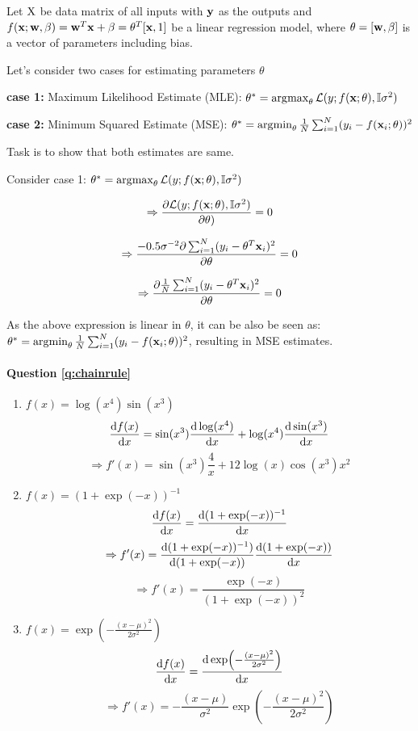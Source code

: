 Let ${\mathrm{{X}}}$ be data matrix of all inputs with $\mathbf{y}$ as the outputs and $f(\mathbf{x}; \mathbf{w}, \beta) = \mathbf{w}^T\mathbf{x} + \beta = \theta^T[\mathbf{x}, 1]$ be a linear regression model, where $\theta=[\mathbf{w}, \beta]$ is a vector of parameters including bias.

Let's consider two cases for estimating parameters $\theta$

\textbf{case 1:} Maximum Likelihood Estimate (MLE): 
$\theta^* = \operatorname*{\arg\!\max}_{\theta} \mathcal{L}(y; f(\mathbf{x}; \theta), \mathbb{I}\sigma^2)$

\textbf{case 2:} Minimum Squared Estimate (MSE):
$\theta^* = \operatorname*{\arg\!\min}_{\theta} \frac{1}{N}\sum_{i=1}^N(y_i - f(\mathbf{x}_i; \theta))^2$

Task is to show that both estimates are same.



Consider case 1: $\theta^* = \operatorname*{\arg\!\max}_{\theta} \mathcal{L}(y; f(\mathbf{x}; \theta), \mathbb{I}\sigma^2)$

$$ \Rightarrow \frac{\partial \mathcal{L}(y; f(\mathbf{x}; \theta), \mathbb{I}\sigma^2)}{\partial \theta)} = 0 $$


$$ \Rightarrow \frac{-0.5\sigma^{-2}\partial \sum_{i=1}^N (y_i - \theta^T\mathbf{x}_i)^2}{\partial \theta} = 0 $$

$$ \Rightarrow \frac{\partial \frac{1}{N}\sum_{i=1}^N (y_i - \theta^T\mathbf{x}_i)^2}{\partial \theta} = 0 $$

As the above expression is linear in $\theta$, it can be also be seen as: $\theta^* = \operatorname*{\arg\!\min}_{\theta} \frac{1}{N}\sum_{i=1}^N(y_i - f(\mathbf{x}_i; \theta))^2$, resulting in MSE estimates.




\paragraph{Question \ref{q:chainrule}}
\begin{enumerate}[label=\alph*.]
\item $f(x) = \log (x^4) \sin (x^3)$
        $$\frac{\mathrm{d} f(x)}{\mathrm{d} x} = \sin(x^3) \frac{\mathrm{d} \log(x^4)}{\mathrm{d} x} + \log (x^4)\frac{\mathrm{d} \sin(x^3)}{\mathrm{d} x}$$
        $$\Rightarrow f'(x) = \sin(x^3)\frac{4}{x} + 12\log(x)\cos(x^3)x^2$$
        
\item $f(x) = (1 + \exp(-x))^{-1}$
         $$\frac{\mathrm{d} f(x)}{\mathrm{d} x} = \frac{\mathrm{d} (1 + \exp(-x))^{-1}}{\mathrm{d} x}$$
         $$\Rightarrow f'(x) = \frac{\mathrm{d} (1 + \exp(-x))^{-1})}{\mathrm{d}(1 + \exp(-x))} \frac{\mathrm{d}(1 + \exp(-x))}{\mathrm{d} x}$$
         $$\Rightarrow f'(x) = \frac{\exp(-x)}{(1 + \exp(-x))^2}$$
        
\item $f(x) = \exp\left(-\frac{(x-\mu)^2}{2\sigma^2}\right)$
         $$\frac{\calcd f(x)}{\calcd x} = \frac{\calcd \exp\left(-\frac{(x-\mu)^2}{2\sigma^2}\right)}{\calcd x}$$
         $$\Rightarrow f'(x) = -\frac{(x-\mu)}{\sigma^2}\exp\left(-\frac{(x-\mu)^2}{2\sigma^2}\right)$$

\end{enumerate}
